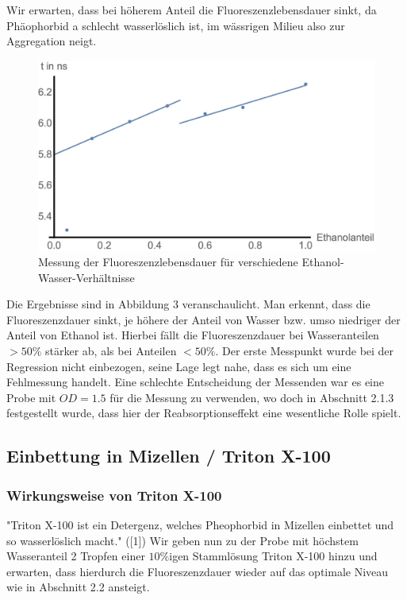 \documentclass{article}
\begin{document}
Wir erwarten, dass bei höherem Anteil die Fluoreszenzlebensdauer sinkt, da Phäophorbid a schlecht wasserlöslich ist, im wässrigen Milieu also zur
Aggregation neigt.

\begin{figure}[h]
  \centering
  \includegraphics[width=\textwidth]{Bilder/FitEthH2O.jpg}
  \caption{Messung der Fluoreszenzlebensdauer für verschiedene Ethanol-Wasser-Verhältnisse}
\end{figure}

Die Ergebnisse sind in Abbildung 3 veranschaulicht. Man erkennt, dass die Fluoreszenzdauer sinkt, je höhere der Anteil von Wasser bzw.
umso niedriger der Anteil von Ethanol ist. Hierbei fällt die Fluoreszenzdauer bei Wasseranteilen $>50\%$ stärker ab, als bei Anteilen $<50\%$.
Der erste Messpunkt wurde bei der Regression nicht einbezogen, seine Lage legt nahe, dass es sich um eine Fehlmessung handelt. Eine schlechte Entscheidung
der Messenden war es eine Probe mit $OD = 1.5$ für die Messung zu verwenden, wo doch in Abschnitt 2.1.3 festgestellt wurde, dass hier der
Reabsorptionseffekt eine wesentliche Rolle spielt.






\subsection{Einbettung in Mizellen / Triton X-100}


\subsubsection{Wirkungsweise von Triton X-100}
"Triton X-100 ist ein Detergenz, welches Pheophorbid in Mizellen einbettet und so wasserlöslich
macht." ([1]) Wir geben nun zu der Probe mit höchstem Wasseranteil 2 Tropfen einer $10\%$igen Stammlösung Triton X-100
hinzu und erwarten, dass hierdurch die Fluoreszenzdauer wieder auf das optimale Niveau wie in Abschnitt 2.2 ansteigt.
\end{document}
